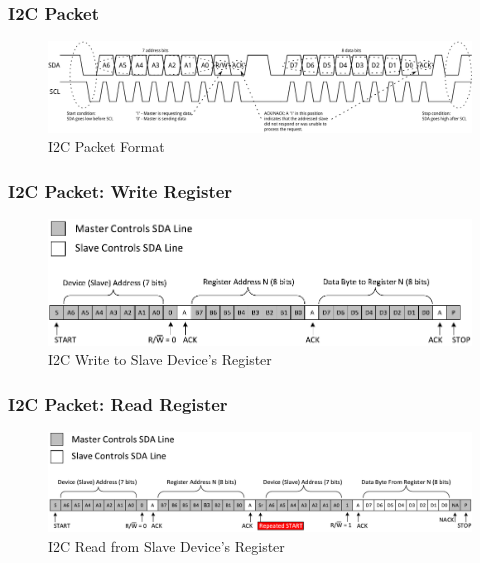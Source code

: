 \documentclass[aspectratio=169,usenames,dvipsnames]{beamer}
\begin{document}
\begin{frame}
  \frametitle{I2C Packet}
  \begin{figure}
    \hspace*{-8mm}
    \includegraphics[scale=0.58]{images/i2c-packet.png}\hspace*{-8mm}
    \caption{I2C Packet Format}
  \end{figure}
\end{frame}

\begin{frame}
  \frametitle{I2C Packet: Write Register}
  \begin{figure}
    \hspace*{-8mm}
    \includegraphics[scale=0.9]{images/i2c-write-reg.pdf}\hspace*{-8mm}
    \caption{I2C Write to Slave Device's Register}
  \end{figure}
\end{frame}

\begin{frame}
  \frametitle{I2C Packet: Read Register}
  \begin{figure}
    \hspace*{-10mm}
    \includegraphics[scale=0.9]{images/i2c-read-reg.pdf}\hspace*{-10mm}
    \caption{I2C Read from Slave Device's Register}
  \end{figure}
\end{frame}
\end{document}
